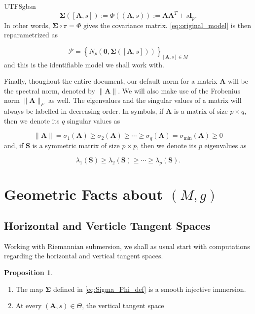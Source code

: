 \documentclass[12pt]{report}
\newcommand{\bracket}[1]{\left ( #1 \right )}
\newcommand{\curly}[1]{\left \{ #1 \right \} }
\theoremstyle{plain}
\theoremstyle{definition}
\newtheorem{proposition}[theorem]{Proposition}
\begin{document}
\begin{CJK*}{UTF8}{gbsn}
\begin{equation}\label{eq:Sigma_Phi_def}
  \bm{\Sigma}([\bm{A},s]) := \Phi((\bm{A},s)) := \bm{A}\bm{A}^T + s\bm{I}_p.
\end{equation}
In other words, $\bm{\Sigma} \circ \pi = \Phi$
gives the covariance matrix.
\eqref{eq:original_model} is then reparametrized as

\begin{equation}\label{eq:quotient_model}
  \mathcal{P} = \curly{N_p\bracket{\bm{0}, \bm{\Sigma}([\bm{A},s])}}_{[\bm{A},s]\in M}
\end{equation}
and this is the identifiable model we shall work with.

Finally, thoughout the entire document,
our default norm for a matrix $\bm{A}$
will be the spectral norm, denoted by $\|\bm{A}\|$.
We will also make use of the 
Frobenius norm $\|\bm{A}\|_F$ as well.
The eigenvalues and the singular values of a matrix 
will always be labelled in decreasing order.
In symbols, if $\bm{A}$ is a matrix of size $p \times q$,
then we denote its $q$ singular values as 

\begin{equation*}
  \|\bm{A}\| = \sigma_1(\bm{A}) \geqslant \sigma_2(\bm{A}) \geqslant \cdots \geqslant 
  \sigma_q(\bm{A}) = \sigma_{\min}(\bm{A}) \geqslant 0
\end{equation*}
and, if $\bm{S}$ is a symmetric matrix of size $p \times p$,
then we denote its $p$ eigenvalues as 

\begin{equation*}
  \lambda_1(\bm{S}) \geqslant \lambda_2(\bm{S}) 
  \geqslant \cdots \geqslant \lambda_p(\bm{S}).
\end{equation*}

\section{Geometric Facts about $(M,g)$}

\subsection{Horizontal and Verticle Tangent Spaces}
Working with Riemannian submersion, 
we shall as usual start with computations regarding the horizontal and vertical 
tangent spaces.

\begin{proposition}\label{thm:horizontal_vertical}
\,
\begin{enumerate}
  \item The map $\bm{\Sigma}$ defined in \eqref{eq:Sigma_Phi_def}
is a smooth injective immersion.
  \item At every $(\bm{A},s) \in \Theta$,
  the vertical tangent space 


\end{enumerate}
\end{proposition}
\end{CJK*}
\end{document}
